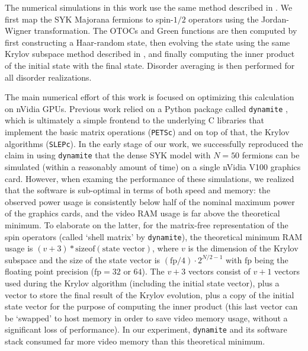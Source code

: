 \documentclass[preprint,12pt]{elsarticle}
\begin{document}

The numerical simulations in this work use the same method described in \cite{kobrin2020supp}. We
first map the SYK Majorana fermions to spin-$1/2$ operators using the Jordan-Wigner
transformation. The OTOCs and Green functions are then computed by first constructing
a Haar-random state, then evolving the state using the same Krylov subspace method
described in \cite{kobrin2020supp}, and finally computing the inner product of the initial state
with the final state. Disorder averaging is then performed for all disorder realizations.

The main numerical effort of this work is focused on optimizing this calculation on nVidia
GPUs. Previous work \cite{kobrin2020supp,caceres2023} relied on a Python package
called {\tt dynamite} \cite{dynamite2023},
which is ultimately a simple frontend to the underlying C libraries that implement the
basic matrix operations ({\tt PETSc}) and on top of that, the Krylov algorithms ({\tt SLEPc}).
In the early stage of our work, we successfully reproduced the claim in \cite{kobrin2020supp}
using {\tt dynamite} that the
dense SYK model with $N=50$ fermions can be simulated (within a reasonably amount of time)
on a single nVidia V100 graphics card. However, when examing the performance of these
simulations, we realized that the software is sub-optimal in terms of both speed and memory:
the observed power usage is consistently below half of the nominal maximum power of the
graphics cards, and the video RAM usage is far above the theoretical minimum. To elaborate on
the latter, for the matrix-free representation of the spin operators (called `shell matrix' by
{\tt dynamite}), the theoretical minimum RAM usage is
$(v+3)*\mathrm{sizeof}(\text{state vector})$, where
$v$ is the dimension of the Krylov subspace and the size of the state vector is
$(\textrm{fp}/4)\cdot 2^{N/2-1}$ with $\textrm{fp}$ being the floating point precision
($\textrm{fp} = 32$ or $64$). The $v+3$ vectors consist of $v+1$ vectors used during the
Krylov algorithm (including the initial state vector), plus a vector to store the final
result of the Krylov evolution, plus a copy of the initial state vector for the
purpose of computing the inner product (this last vector can be `swapped' to host memory
in order to save video memory usage, without a significant loss of performance). In our
experiment, {\tt dynamite} and its software stack consumed far more video memory than this
theoretical minimum.
\end{document}
